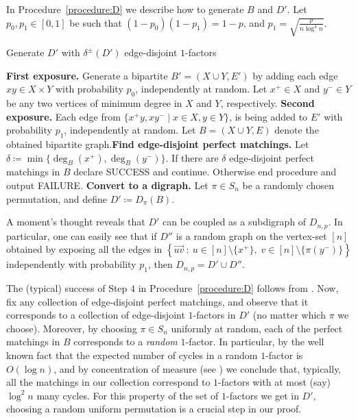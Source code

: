 \documentclass{article}
\begin{document}
	In Procedure~\ref{procedure:D} we describe how to generate $B$ and $D'$. Let $p_0, p_1 \in [0,1]$ be such that $(1-p_0)(1-p_1) = 1-p$, and $p_1 = \sqrt{\frac{p}{n \log^4 n}}$.
	\begin{algorithm}
		\caption{Generate $D'$ with $\delta^{\pm}(D')$ edge-disjoint $1$-factors}
		\label{procedure:D}
		\begin{algorithmic}[1]
			\STATE \textbf{First exposure.} Generate a bipartite $B'=(X\cup Y,E')$ by adding each edge $xy\in X\times Y$ with probability $p_0$, independently at random.
			\STATE Let $x^+ \in X$ and $y^- \in Y$ be any two vertices of minimum degree in $X$ and $Y$, respectively.
			\STATE \textbf{Second exposure.} Each edge from $\{x^+y, xy^- \mid x\in X,y\in Y\}$, is being added to $E'$ with probability $p_1$, independently at random. Let $B= (X\cup Y, E)$ denote the obtained bipartite graph.\STATE \textbf{Find edge-disjoint perfect matchings.} Let $\delta \coloneqq \min\{\deg_{B}(x^+), \deg_{B}(y^-) \}$.
			If there are $\delta$ edge-disjoint perfect matchings in $B$ declare SUCCESS and continue.
			Otherwise end procedure and output FAILURE.
			\STATE \textbf{Convert to a digraph.} Let $\pi \in S_n$ be a randomly chosen permutation, and define $D' \coloneqq D_{\pi}(B)$.
		\end{algorithmic}
	\end{algorithm}
	
	A moment's thought reveals that $D'$ can be coupled as a subdigraph of $D_{n,p}$.
	In particular, one can easily see that if $D''$ is a random graph on the vertex-set $[n]$ obtained by exposing all the edges in $\left\{\overrightarrow{uv} ~:~ u \in [n]\setminus \{x^+ \}, \; v \in [n]\setminus \{\pi(y^-) \} \right\}$ independently with probability $p_1$, then $D_{n,p}=D'\cup D''$.
	
	The (typical) success of Step $4$ in Procedure~\ref{procedure:D} follows from .
	Now, fix any collection of edge-disjoint perfect matchings, and observe that it corresponds to a collection of edge-disjoint $1$-factors in $D'$ (no matter which $\pi$ we choose).
	Moreover, by choosing $\pi\in S_n$ uniformly at random, each of the perfect matchings in $B$ corresponds to a \emph{random} $1$-factor.
	In particular, by the well known fact that the expected number of cycles in a random $1$-factor is $O(\log n)$, and by concentration of measure (see ) we conclude that, typically, all the matchings in our collection correspond to $1$-factors with at most (say) $\log^2n$ many cycles.
	For this property of the set of $1$-factors we get in $D'$, choosing a random uniform permutation is a crucial step in our proof.
	
\end{document}
